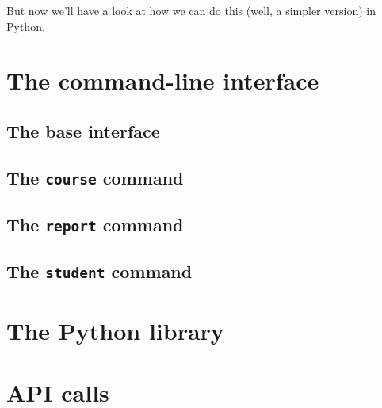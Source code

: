 \documentclass[a4paper,oneside]{memoir}
\begin{document}
But now we'll have a look at how we can do this (well, a simpler version) in 
Python.





\part{The command-line interface}

\chapter{The base interface}



\chapter{The \texttt{course} command}



\chapter{The \texttt{report} command}



\chapter{The \texttt{student} command}





\part{The Python library}




\part{API calls}






\backmatter
\printbibliography
\end{document}

